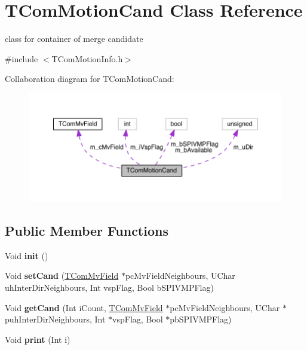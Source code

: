 \hypertarget{class_t_com_motion_cand}{}\section{T\+Com\+Motion\+Cand Class Reference}
\label{class_t_com_motion_cand}


class for container of merge candidate  




{\ttfamily \#include $<$T\+Com\+Motion\+Info.\+h$>$}



Collaboration diagram for T\+Com\+Motion\+Cand\+:
\nopagebreak
\begin{figure}[H]
\begin{center}
\leavevmode
\includegraphics[width=350pt]{d0/d3c/class_t_com_motion_cand__coll__graph}
\end{center}
\end{figure}
\subsection*{Public Member Functions}
\begin{DoxyCompactItemize}
\item 
\mbox{\label{class_t_com_motion_cand_adb5e5f92cb4dbcdaba26818c2ef968bc}} 
Void {\bfseries init} ()
\item 
\mbox{\label{class_t_com_motion_cand_a10abafad7aa65b6eb015b0a2de5c76ed}} 
Void {\bfseries set\+Cand} (\hyperlink{class_t_com_mv_field}{T\+Com\+Mv\+Field} $\ast$pc\+Mv\+Field\+Neighbours, U\+Char uh\+Inter\+Dir\+Neighbours, Int vsp\+Flag, Bool b\+S\+P\+I\+V\+M\+P\+Flag)
\item 
\mbox{\label{class_t_com_motion_cand_a069c5df5e1cf27c180c8d8b4b634136b}} 
Void {\bfseries get\+Cand} (Int i\+Count, \hyperlink{class_t_com_mv_field}{T\+Com\+Mv\+Field} $\ast$pc\+Mv\+Field\+Neighbours, U\+Char $\ast$puh\+Inter\+Dir\+Neighbours, Int $\ast$vsp\+Flag, Bool $\ast$pb\+S\+P\+I\+V\+M\+P\+Flag)
\end{DoxyCompactItemize}
{\bf }\par
\begin{DoxyCompactItemize}
\item 
\mbox{\label{class_t_com_motion_cand_af3963523f7d18a9ac7cdb39c783e230b}} 
Void {\bfseries print} (Int i)
\end{DoxyCompactItemize}

